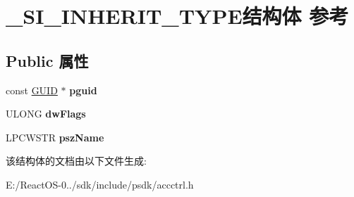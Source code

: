 \hypertarget{struct___s_i___i_n_h_e_r_i_t___t_y_p_e}{}\section{\+\_\+\+S\+I\+\_\+\+I\+N\+H\+E\+R\+I\+T\+\_\+\+T\+Y\+P\+E结构体 参考}
\label{struct___s_i___i_n_h_e_r_i_t___t_y_p_e}
\subsection*{Public 属性}
\begin{DoxyCompactItemize}
\item 
\mbox{\label{struct___s_i___i_n_h_e_r_i_t___t_y_p_e_aba01931b713f9607b553dff6eea8ca1e}} 
const \hyperlink{interface_g_u_i_d}{G\+U\+ID} $\ast$ {\bfseries pguid}
\item 
\mbox{\label{struct___s_i___i_n_h_e_r_i_t___t_y_p_e_af00503c2a7767f4e7911ffe8f7217698}} 
U\+L\+O\+NG {\bfseries dw\+Flags}
\item 
\mbox{\label{struct___s_i___i_n_h_e_r_i_t___t_y_p_e_a3858ed31913f7a866b983e620235570b}} 
L\+P\+C\+W\+S\+TR {\bfseries psz\+Name}
\end{DoxyCompactItemize}


该结构体的文档由以下文件生成\+:\begin{DoxyCompactItemize}
\item 
E\+:/\+React\+O\+S-\/0../sdk/include/psdk/accctrl.\+h\end{DoxyCompactItemize}
